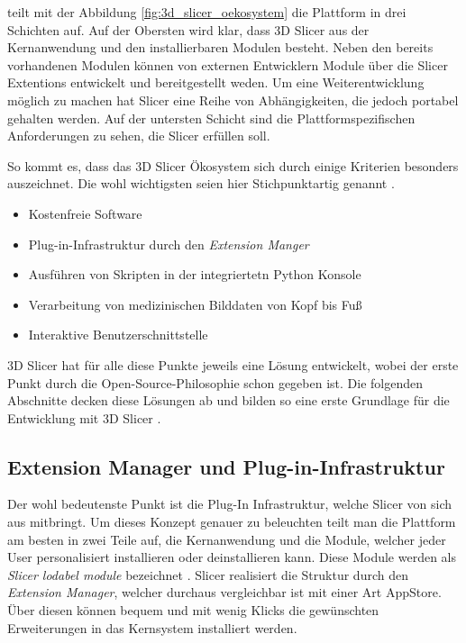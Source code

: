 \citet[S.~23]{fedorov2012slicer} teilt mit der Abbildung \ref{fig:3d_slicer_oekosystem}
die Plattform in drei Schichten auf. Auf der Obersten wird klar, dass 3D Slicer aus
der Kernanwendung und den installierbaren Modulen besteht. Neben den bereits
vorhandenen Modulen können von externen Entwicklern Module über die Slicer
Extentions entwickelt und bereitgestellt weden. Um eine Weiterentwicklung möglich
zu machen hat Slicer eine Reihe von Abhängigkeiten, die jedoch portabel gehalten
werden. Auf der untersten Schicht sind die Plattformspezifischen Anforderungen zu
sehen, die Slicer erfüllen soll.

So kommt es, dass das 3D Slicer Ökosystem sich durch einige Kriterien besonders auszeichnet.
Die wohl wichtigsten seien hier Stichpunktartig genannt \citep[vgl.][S.~11]{fedorov2012slicer}.

\begin{itemize}
	\item Kostenfreie Software

	\item Plug-in-Infrastruktur durch den \textit{Extension Manger}

	\item Ausführen von Skripten in der integriertetn Python Konsole

	\item Verarbeitung von medizinischen Bilddaten von Kopf bis Fuß

	\item Interaktive Benutzerschnittstelle
\end{itemize}

3D Slicer hat für alle diese Punkte jeweils eine Lösung entwickelt, wobei der erste
Punkt durch die Open-Source-Philosophie schon gegeben ist. Die folgenden
Abschnitte decken diese Lösungen ab und bilden so eine erste Grundlage für die
Entwicklung mit 3D Slicer \citep[vgl.][S.~11]{fedorov2012slicer}.

\subsection{Extension Manager und Plug-in-Infrastruktur}
Der wohl bedeutenste Punkt ist die Plug-In Infrastruktur, welche Slicer von sich
aus mitbringt. Um dieses Konzept genauer zu beleuchten teilt man die Plattform am
besten in zwei Teile auf, die Kernanwendung und die Module, welcher jeder User personalisiert
installieren oder deinstallieren kann. Diese Module werden als \textit{Slicer
lodabel module} bezeichnet \citep[vgl.][S.~25]{fedorov2012slicer}. Slicer realisiert
die Struktur durch den \textit{Extension Manager}, welcher durchaus vergleichbar
ist mit einer Art AppStore. Über diesen können bequem und mit wenig Klicks die
gewünschten Erweiterungen in das Kernsystem installiert werden.

